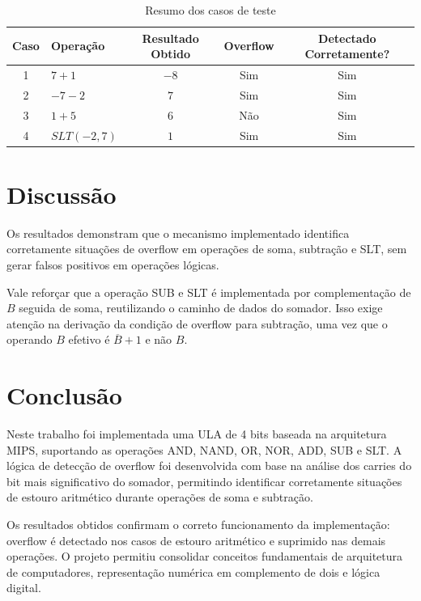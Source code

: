 \documentclass[a4paper,12pt]{article}
\begin{document}
\begin{table}[H]
\centering
\caption{Resumo dos casos de teste}
\label{tab:resultados}
\begin{tabular}{clccc}
\toprule
\textbf{Caso} & \textbf{Operação} & \textbf{Resultado Obtido} &
\textbf{Overflow} & \textbf{Detectado Corretamente?} \\
\midrule
1 & $7 + 1$ & $-8$ & Sim & Sim \\
2 & $-7 - 2$ & $7$ & Sim & Sim \\
3 & $1 + 5$ & $6$ & Não & Sim \\
4 & $SLT(-2, 7)$ & $1$ & Sim & Sim \\
\bottomrule
\end{tabular}
\end{table}

\section{Discussão}

Os resultados demonstram que o mecanismo implementado identifica corretamente situações de overflow em operações de soma, subtração e SLT, sem gerar falsos positivos em operações lógicas.

Vale reforçar que a operação SUB e SLT é implementada por complementação de $B$ seguida de soma, reutilizando o caminho de dados do somador. Isso exige atenção na derivação da condição de overflow para subtração, uma vez que o operando $B$
efetivo é $\overline{B}+1$ e não $B$.

\section{Conclusão}

Neste trabalho foi implementada uma ULA de 4 bits baseada na arquitetura MIPS, suportando as operações AND, NAND, OR, NOR, ADD, SUB e SLT. A lógica de detecção de overflow foi desenvolvida com base na análise dos carries do bit mais significativo do somador, permitindo identificar corretamente situações de estouro aritmético durante operações de soma e subtração.

Os resultados obtidos confirmam o correto funcionamento da implementação: overflow é detectado nos casos de estouro aritmético e suprimido nas demais operações. O projeto permitiu consolidar conceitos fundamentais de arquitetura de computadores, representação numérica em complemento de dois e lógica digital.



\end{document}
